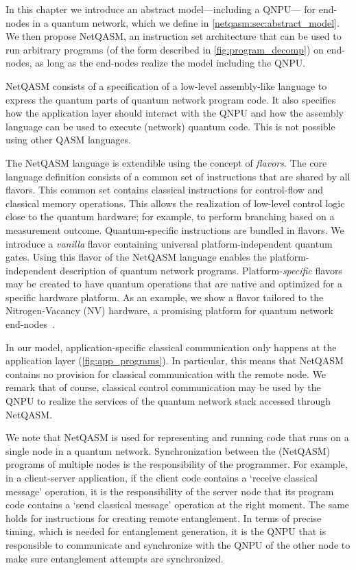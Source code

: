 In this chapter we introduce an abstract model---including a \ac{QNPU}--- for end-nodes in a quantum network, which we define in \cref{netqasm:sec:abstract_model}.
We then propose \ac{NetQASM}, an instruction set architecture that can be used to run arbitrary programs (of the form described in \cref{fig:program_decomp}) on end-nodes, as long as the end-nodes realize the model including the QNPU.

\ac{NetQASM} consists of a specification of a low-level assembly-like language to express the quantum parts of quantum network program code.
It also specifies how the application layer should interact with the \ac{QNPU} and how the assembly language can be used to execute (network) quantum code.
This is not possible using other QASM languages.

The \ac{NetQASM} language is extendible using the concept of \textit{flavors}.
The core language definition consists of a common set of instructions that are shared by all flavors.
This common set contains classical instructions for control-flow and classical memory operations.
This allows the realization of low-level control logic close to the quantum hardware;
for example, to perform branching based on a measurement outcome.
Quantum-specific instructions are bundled in flavors.
We introduce a \textit{vanilla} flavor containing universal platform-independent quantum gates.
Using this flavor of the \ac{NetQASM} language enables the platform-independent description of quantum network programs.
Platform-\textit{specific} flavors may be created to have quantum operations that are native and optimized for a specific hardware platform.
As an example, we show a flavor tailored to the Nitrogen-Vacancy (NV) hardware, a promising platform for quantum network end-nodes~\cite{Taminiau2014, hanson2021realization}.

In our model, application-specific classical communication only happens at the application layer (\cref{fig:app_programs}).
In particular, this means that \ac{NetQASM} contains no provision for classical communication with the remote node.
We remark that of course, classical control communication may be used by the \ac{QNPU} to realize the services of the quantum network stack accessed through \ac{NetQASM}.

We note that \ac{NetQASM} is used for representing and running code that runs on a single node in a quantum network.
Synchronization between the (\ac{NetQASM}) programs of multiple nodes is the responsibility of the programmer.
For example, in a client-server application, if the client code contains a `receive classical message' operation, it is the responsibility of the server node that its program code contains a `send classical message' operation at the right moment.
The same holds for instructions for creating remote entanglement.
In terms of precise timing, which is needed for entanglement generation, it is the \ac{QNPU} that is responsible to communicate and synchronize with the \ac{QNPU} of the other node to make sure entanglement attempts are synchronized.

